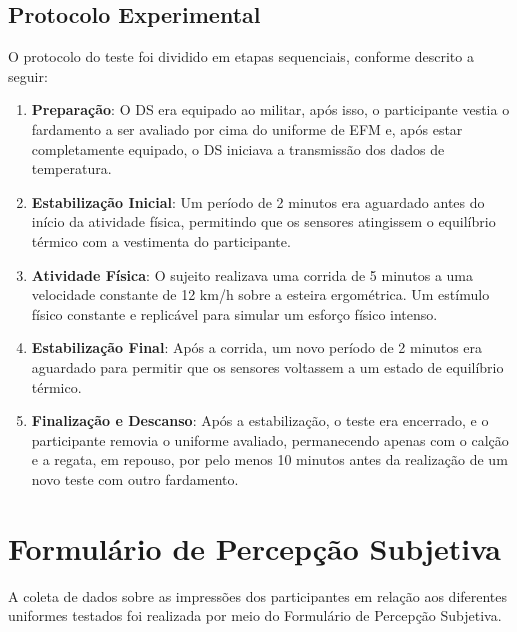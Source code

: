 \subsection{Protocolo Experimental}

O protocolo do teste foi dividido em etapas sequenciais, conforme descrito a seguir:
\begin{enumerate}
    \item \textbf{Preparação}: O \acrlong{DS} era equipado ao militar, após isso, o participante vestia o fardamento a ser avaliado por cima do uniforme de \acrshort{EFM} e, após estar completamente equipado, o \acrshort{DS} iniciava a transmissão dos dados de temperatura.
    \item \textbf{Estabilização Inicial}: Um período de 2 minutos era aguardado antes do início da atividade física, permitindo que os sensores atingissem o equilíbrio térmico com a vestimenta do participante.
    \item \textbf{Atividade Física}: O sujeito realizava uma corrida de 5 minutos a uma velocidade constante de 12 km/h sobre a esteira ergométrica. Um estímulo físico constante e replicável para simular um esforço físico intenso.
    \item \textbf{Estabilização Final}: Após a corrida, um novo período de 2 minutos era aguardado para permitir que os sensores voltassem a um estado de equilíbrio térmico.
    \item \textbf{Finalização e Descanso}: Após a estabilização, o teste era encerrado, e o participante removia o uniforme avaliado, permanecendo apenas com o calção e a regata, em repouso, por pelo menos 10 minutos antes da realização de um novo teste com outro fardamento.
\end{enumerate}


\section{Formulário de Percepção Subjetiva}

A coleta de dados sobre as impressões dos participantes em relação aos diferentes uniformes testados foi realizada por meio do Formulário de Percepção Subjetiva. %

